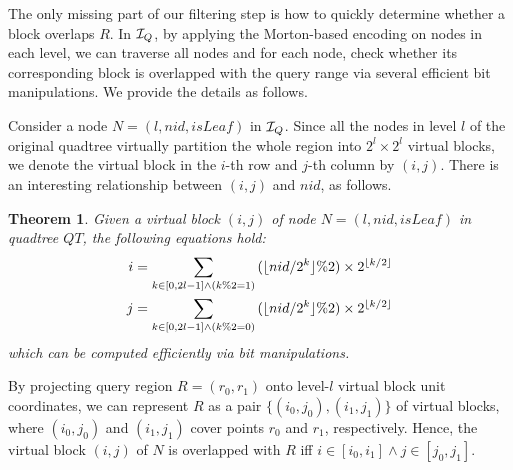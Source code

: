 \documentclass[10pt,conference,letterpaper]{IEEEtran}
\newcommand{\treeindex}{{{\cal I}_Q}\xspace}
\newtheorem{theorem}{Theorem}
\begin{document}
The only missing part of our filtering step is how to quickly determine whether a block overlaps $R$.
In $\treeindex$, by applying the Morton-based encoding on nodes in each level, we can traverse all nodes and for each node, check whether its corresponding block is overlapped with the query range via several efficient bit manipulations. 
We provide the details as follows.

Consider a node $N=(l,nid, isLeaf)$ in $\treeindex$.
Since all the nodes in level $l$ of the original quadtree virtually partition the whole region into $2^l\times 2^l$ virtual blocks, we denote the virtual block in the $i$-th row and $j$-th column by $(i,j)$. There is an interesting relationship between $(i,j)$ and $nid$, as follows.
\begin{theorem}
	Given a virtual block $(i,j)$ of node $N=(l,nid, isLeaf)$ in quadtree $QT$, the following equations hold:
	\begin{equation}\label{eq:nid}
	\small
	\begin{aligned}
	i &= \sum_{k\in[0, 2l-1]\wedge (k\%2=1)} {(\lfloor nid/2^k \rfloor\% 2) \times2^{\lfloor k/2\rfloor}} \\
	j &= \sum_{k\in[0, 2l-1]\wedge (k\%2=0)} {(\lfloor nid/2^k \rfloor\% 2) \times2^{\lfloor k/2\rfloor}}
	\end{aligned}
	\end{equation}
	which can be computed efficiently via bit manipulations.
\end{theorem}

By projecting query region $R=(r_0, r_1)$ onto level-$l$ virtual block unit coordinates, we can represent $R$ as a pair $\{(i_0,j_0), (i_1,j_1)\}$ of virtual blocks, where $(i_0,j_0)$ and $(i_1,j_1)$ cover points $r_0$ and $r_1$, respectively.
Hence, the virtual block $(i,j)$ of $N$ is overlapped with $R$ iff
$i\in[i_0, i_1]\wedge j\in[j_0, j_1]$.
\end{document}
